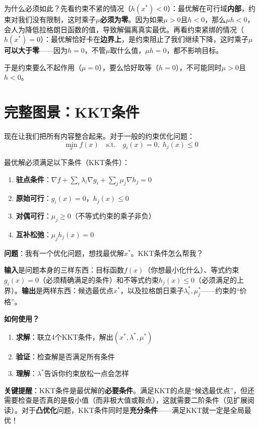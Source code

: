 为什么必须如此？先看约束不紧的情况（$h(x^*) < 0$）：最优解在可行域\textbf{内部}，约束对我们没有限制，这时乘子$\mu$\textbf{必须为零}。因为如果$\mu > 0$且$h < 0$，那么$\mu h < 0$，会人为降低拉格朗日函数的值，导致解偏离真实最优。再看约束紧绑的情况（$h(x^*) = 0$）：最优解恰好卡在\textbf{边界上}，是约束阻止了我们继续下降，这时乘子$\mu$\textbf{可以大于零}——因为$h = 0$，不管$\mu$取什么值，$\mu h = 0$，都不影响目标。

于是约束要么不起作用（$\mu=0$），要么恰好取等（$h=0$），不可能同时$\mu > 0$且$h < 0$。


\section{完整图景：KKT条件}

现在让我们把所有内容整合起来。对于一般的约束优化问题：
\[
\min_x f(x) \quad \text{s.t.} \quad g_i(x) = 0, \; h_j(x) \leq 0
\]

最优解必须满足以下条件（KKT条件）：

\begin{enumerate}
    \item \textbf{驻点条件}：$\nabla f + \sum_i \lambda_i \nabla g_i + \sum_j \mu_j \nabla h_j = 0$
    \item \textbf{原始可行}：$g_i(x) = 0$，$h_j(x) \leq 0$
    \item \textbf{对偶可行}：$\mu_j \geq 0$（不等式约束的乘子非负）
    \item \textbf{互补松弛}：$\mu_j h_j(x) = 0$
\end{enumerate}

\begin{keyidea}
\textbf{问题}：我有一个优化问题，想找最优解$x^*$。KKT条件怎么帮我？

\textbf{输入}是问题本身的三样东西：目标函数$f(x)$（你想最小化什么）、等式约束$g_i(x) = 0$（必须精确满足的条件）和不等式约束$h_j(x) \leq 0$（必须满足的上界）。\textbf{输出}是两样东西：候选最优点$x^*$，以及拉格朗日乘子$\lambda_i^*, \mu_j^*$——约束的“价格”。

\textbf{如何使用？}
\begin{enumerate}
    \item \textbf{求解}：联立4个KKT条件，解出$(x^*, \lambda^*, \mu^*)$
    \item \textbf{验证}：检查解是否满足所有条件
    \item \textbf{理解}：$\lambda^*$告诉你约束放松一点会怎样
\end{enumerate}

\textbf{关键提醒}：KKT条件是最优解的\textbf{必要条件}。满足KKT的点是“候选最优点”，但还需要检查是否真的是极小值（而非极大值或鞍点），这就需要二阶条件（见扩展阅读）。对于\textbf{凸优化}问题，KKT条件同时是\textbf{充分条件}——满足KKT就一定是全局最优！
\end{keyidea}

